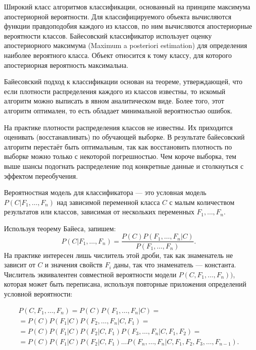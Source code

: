 Широкий класс алгоритмов классификации, основанный на принципе максимума
апостериорной вероятности. Для классифицируемого объекта вычисляются функции
правдоподобия каждого из классов, по ним вычисляются апостериорные вероятности
классов. Байесовский классификатор использует оценку апостериорного максимума
(Maximum a posteriori estimation) для определения наиболее вероятного класса.
Объект относится к тому классу, для которого апостериорная вероятность
максимальна.

Байесовский подход к классификации основан на теореме, утверждающей, что
если плотности распределения каждого из классов известны, то искомый алгоритм
можно выписать в явном аналитическом виде. Более того, этот алгоритм оптимален,
то есть обладает минимальной вероятностью ошибок.

На практике плотности распределения классов не известны. Их приходится
оценивать (восстанавливать) по обучающей выборке. В результате байесовский
алгоритм перестаёт быть оптимальным, так как восстановить плотность по выборке
можно только с некоторой погрешностью. Чем короче выборка, тем выше шансы
подогнать распределение под конкретные данные и столкнуться с эффектом
переобучения.

Вероятностная модель для классификатора — это условная модель $P(C|F_1, \dots, F_n)$
над зависимой переменной класса $C$ с малым количеством результатов или
классов, зависимая от нескольких переменных $F_1, \dots, F_n$.

Используя теорему Байеса, запишем:
\begin{equation}
	P(C|F_1, \dots, F_n) = \frac{P(C)P(F_1, \dots, F_n|C)}{P(F_1, \dots, F_n)}.
\end{equation}
На практике интересен лишь числитель этой дроби, так как знаменатель не
зависит от $C$ и значения свойств $F_i$ даны, так что знаменатель — константа.
Числитель эквивалентен совместной вероятности модели $P(C, F_1, \dots, F_n))$,
которая может быть переписана, используя повторные приложения
определений условной вероятности:

\begin{equation}
\begin{split}
	P(C, F_1, \dots, F_n) = P(C)P(F_1, \dots, F_n|C) 
	=\\= P(C)P(F_1|C)P(F_2, \dots, F_n|C, F_1) 
	=\\= P(C)P(F_1|C)P(F_2|C,F_1)P(F_3, \dots, F_n|C, F_1, F_2) 
	=\\= P(C)P(F_1|C)P(F_2|C,F_1) \dots P(F_n, \dots, F_n|C, F_1, F_2, F_3, \dots, F_{n-1}).
\end{split}
\end{equation}



\clearpage
